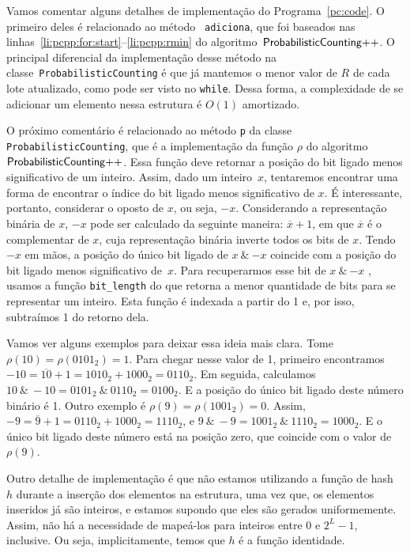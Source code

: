 Vamos comentar alguns detalhes de implementação do Programa~\ref{pc:code}. O primeiro deles é relacionado ao método
~\texttt{adiciona}, que foi baseados nas linhas~\ref{li:pcpp:for:start}--\ref{li:pcpp:rmin} do algoritmo~$\textsf{ProbabilisticCounting{++}}$. O 
principal diferencial da implementação desse método na classe~\texttt{ProbabilisticCounting} é que já mantemos o menor
valor de $R$ de cada lote atualizado, como pode ser visto no \texttt{while}. Dessa forma, a complexidade de se adicionar
um elemento nessa estrutura é $O(1)$ amortizado.

O próximo comentário é relacionado ao método \texttt{p} da classe \texttt{ProbabilisticCounting}, que é a implementação 
da função $\rho$ do algoritmo~$\textsf{ProbabilisticCounting{++}}$. Essa função deve retornar a posição do bit ligado menos significativo de um 
inteiro. Assim, dado um inteiro~$x$, tentaremos encontrar uma forma de encontrar o índice do bit ligado menos 
significativo de $x$. É interessante, portanto, considerar o oposto de $x$, ou seja, $-x$. Considerando a representação 
binária de $x$, $-x$  pode ser calculado da seguinte maneira: $\overline{x} + 1$, em que $\overline{x}$ é o complementar 
de $x$, cuja representação binária inverte todos os bits de $x$. Tendo $-x$ em mãos, a posição do único bit ligado de 
$x \ {\&} \ {-x}$ coincide com a posição do bit ligado menos significativo de~$x$. Para recuperarmos esse bit de 
$x \ {\&} \ {-x}$ , usamos a função \texttt{bit\_length} do  que retorna a menor quantidade de bits para se 
representar um inteiro. Esta função é indexada a partir do 1 e, por isso, subtraímos 1 do retorno dela. 

Vamos ver alguns exemplos para deixar essa ideia mais clara. Tome $\rho(10) = \rho(0101_2) = 1$. Para chegar nesse valor 
de 1, primeiro encontramos $-10 = \overline{10} + 1 = 1010_2 + 1000_2 = 0110_2$. Em seguida, calculamos
$10 \ {\&} \ {-}10 = 0101_2 \ {\&} \ 0110_2 = 0100_2$. E a posição do único bit ligado deste número binário é 1. Outro 
exemplo é $\rho(9) = \rho(1001_2) = 0$. Assim, $-9 = \overline{9} + 1 = 0110_2 + 1000_2 = 1110_2$, e 
$9 \ {\&} \ {-}9 = 1001_2 \ {\&} \ 1110_2 = 1000_2$. E o único bit ligado deste número está na posição zero, que coincide 
com o valor de $\rho(9)$.

Outro detalhe de implementação é que não estamos utilizando a função de hash~$h$ durante a inserção dos elementos na 
estrutura, uma vez que, os elementos inseridos já são inteiros, e estamos supondo que eles são gerados uniformemente. 
Assim, não há a necessidade de mapeá-los para inteiros entre $0$ e $2^{L} - 1$, inclusive. Ou seja, implicitamente, 
temos que $h$ é a função identidade.

